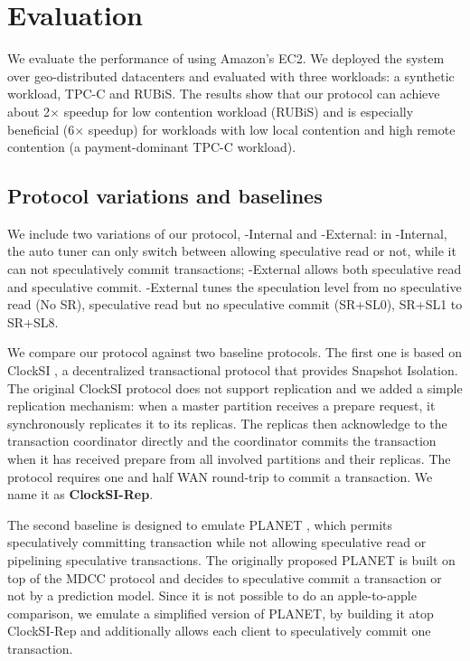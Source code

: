 
\section{Evaluation}
\label{sec:evaluation}
We evaluate the performance of {\specula} using Amazon's EC2. We deployed the system over geo-distributed datacenters and evaluated with three workloads: a synthetic workload, TPC-C and RUBiS. The results show that our protocol can achieve about 2$\times$ speedup for low contention workload (RUBiS) and is especially beneficial (6$\times$ speedup) for workloads with low local contention and high remote contention (a payment-dominant TPC-C workload).

\subsection{Protocol variations and baselines}
We include two variations of our protocol, {\specula}-Internal and  {\specula}-External: in  {\specula}-Internal, the auto tuner can only switch between allowing speculative read or not, while it can not speculatively commit transactions;  {\specula}-External allows both speculative read and speculative commit. {\specula}-External tunes the speculation level from no speculative read (No SR), speculative read but no speculative commit (SR+SL0), SR+SL1 to SR+SL8.
 
We compare our protocol against two baseline protocols. The first one is based on ClockSI \cite{ClockSI}, a decentralized transactional protocol that provides Snapshot Isolation. The original ClockSI protocol does not support replication and we added a simple replication mechanism: when a master partition receives a prepare request, it synchronously replicates it to its replicas. The replicas then acknowledge to the transaction coordinator directly and the coordinator commits the transaction when it has received prepare from all involved partitions and their replicas. The protocol requires one and half WAN round-trip to commit a transaction. We name it as \textbf{ClockSI-Rep}.

The second baseline is designed to emulate PLANET \cite{planet}, which permits speculatively committing transaction while not allowing speculative read or pipelining speculative transactions.  The originally proposed PLANET is built on top of the MDCC protocol \cite{MDCC} and decides to speculative commit a transaction or not by a prediction model. Since it is not possible to do an apple-to-apple comparison, we emulate a simplified version of PLANET, by building it atop ClockSI-Rep and additionally allows each client to speculatively commit one transaction. 

